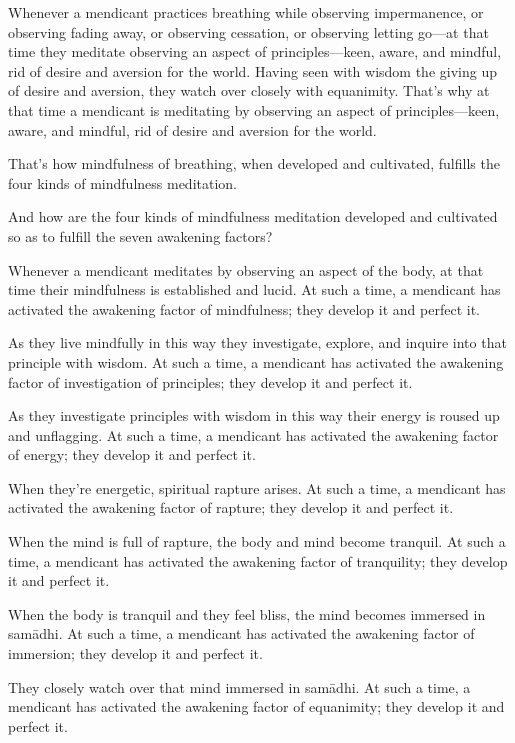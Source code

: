 \documentclass[12pt,openany]{book}%
\begin{document}
Whenever a mendicant practices breathing while observing impermanence, or observing fading away, or observing cessation, or observing letting go—at that time they meditate observing an aspect of principles—keen, aware, and mindful, rid of desire and aversion for the world. Having seen with wisdom the giving up of desire and aversion, they watch over closely with equanimity. That’s why at that time a mendicant is meditating by observing an aspect of principles—keen, aware, and mindful, rid of desire and aversion for the world. 

That’s how mindfulness of breathing, when developed and cultivated, fulfills the four kinds of mindfulness meditation. 

And how are the four kinds of mindfulness meditation developed and cultivated so as to fulfill the seven awakening factors? 

Whenever a mendicant meditates by observing an aspect of the body, at that time their mindfulness is established and lucid. At such a time, a mendicant has activated the awakening factor of mindfulness; they develop it and perfect it. 

As they live mindfully in this way they investigate, explore, and inquire into that principle with wisdom. At such a time, a mendicant has activated the awakening factor of investigation of principles; they develop it and perfect it. 

As they investigate principles with wisdom in this way their energy is roused up and unflagging. At such a time, a mendicant has activated the awakening factor of energy; they develop it and perfect it. 

When they’re energetic, spiritual rapture arises. At such a time, a mendicant has activated the awakening factor of rapture; they develop it and perfect it. 

When the mind is full of rapture, the body and mind become tranquil. At such a time, a mendicant has activated the awakening factor of tranquility; they develop it and perfect it. 

When the body is tranquil and they feel bliss, the mind becomes immersed in \textsanskrit{samādhi}. At such a time, a mendicant has activated the awakening factor of immersion; they develop it and perfect it. 

They closely watch over that mind immersed in \textsanskrit{samādhi}. At such a time, a mendicant has activated the awakening factor of equanimity; they develop it and perfect it. 
\end{document}

